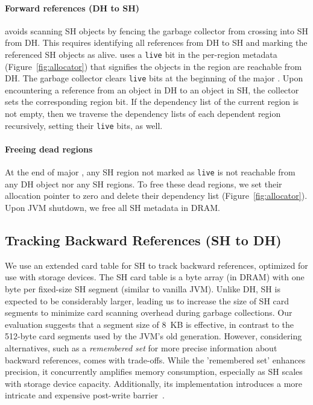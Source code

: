 \paragraph{\textbf{Forward references (DH to SH)}}
\teraheapName{} avoids scanning SH objects by fencing the garbage collector
from crossing into SH from DH. This requires identifying all
references from DH to SH and marking the referenced SH objects as
alive. \teraheapName{} uses a \texttt{live} bit in the per-region metadata
(Figure~\ref{fig:allocator}) that signifies the objects in the region
are reachable from DH. The garbage collector clears \texttt{live} bits at the
beginning of the major \teraheapGC. Upon encountering a reference from an
object in DH to an object in SH, the collector sets the corresponding
region bit. If the dependency list of the current region is not empty,
then we traverse the dependency lists of each dependent region
recursively, setting their \texttt{live} bits, as well.

\paragraph{\textbf{Freeing dead regions}}
At the end of major \teraheapGC{}, any SH region not marked as \texttt{live}
is not reachable from any DH object nor any SH regions. To free these
dead regions, we set their allocation pointer to zero and delete their
dependency list (Figure~\ref{fig:allocator}). Upon JVM shutdown, we
free all SH metadata in DRAM.

\subsection{Tracking Backward References (SH to DH)}
\label{sec:back_ref}
We use an extended card table for SH to track backward references, optimized for
use with storage devices. The SH card table is a byte array (in DRAM) with one
byte per fixed-size SH segment (similar to vanilla JVM). Unlike DH, SH is
expected to be considerably larger, leading us to increase the size of SH card
segments to minimize card scanning overhead during garbage collections. Our
evaluation suggests that a segment size of \SI{8}{KB} is effective, in contrast
to the 512-byte card segments used by the JVM's old generation. However,
considering alternatives, such as a \emph{remembered set} for more precise
information about backward references, comes with trade-offs. While the
'remembered set' enhances precision, it concurrently amplifies memory
consumption, especially as SH scales with storage device capacity. Additionally,
its implementation introduces a more intricate and expensive post-write
barrier~\cite{detlefs:remset}.

